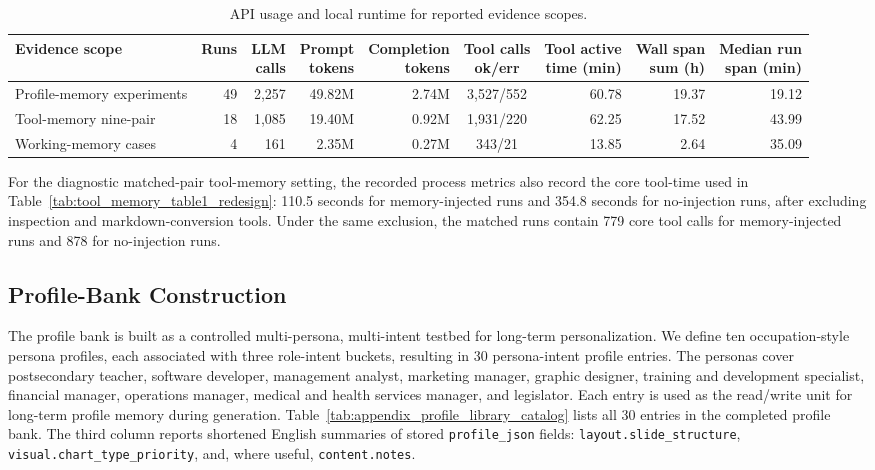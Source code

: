 \documentclass{llmxive}
\providecommand{\arraystretch}{1.0}
\begin{document}
\begin{table}[!htbp]
\centering
\scriptsize
\setlength{\tabcolsep}{3pt}
\renewcommand{\arraystretch}{1.05}
\begin{tabular*}{\textwidth}{@{\extracolsep{\fill}}lrrrrcrrr@{}}
\toprule
Evidence scope & Runs & \shortstack{LLM\\calls} &
\shortstack{Prompt\\tokens} & \shortstack{Completion\\tokens} &
\shortstack{Tool calls\\ok/err} & \shortstack{Tool active\\time (min)} &
\shortstack{Wall span\\sum (h)} & \shortstack{Median run\\span (min)} \\
\midrule
Profile-memory experiments & 49 & 2{,}257 & 49.82M & 2.74M & 3{,}527/552 & 60.78 & 19.37 & 19.12 \\
Tool-memory nine-pair & 18 & 1{,}085 & 19.40M & 0.92M & 1{,}931/220 & 62.25 & 17.52 & 43.99 \\
Working-memory cases & 4 & 161 & 2.35M & 0.27M & 343/21 & 13.85 & 2.64 & 35.09 \\
\bottomrule
\end{tabular*}
\caption{API usage and local runtime for reported evidence scopes.}
\label{tab:appendix_compute_accounting}
\end{table}


For the diagnostic matched-pair tool-memory setting, the recorded process metrics
also record the core tool-time used in Table~\ref{tab:tool_memory_table1_redesign}:
110.5 seconds for memory-injected runs and 354.8 seconds for no-injection runs,
after excluding inspection and markdown-conversion tools. Under the same
exclusion, the matched runs contain 779 core tool calls for memory-injected
runs and 878 for no-injection runs.

\subsection{Profile-Bank Construction}
\label{app:profile_bank_construction}

The profile bank is built as a controlled multi-persona, multi-intent
testbed for long-term personalization. We define ten occupation-style persona
profiles, each associated with three role-intent buckets, resulting in 30
persona-intent profile entries. The personas cover postsecondary teacher,
software developer, management analyst, marketing manager, graphic designer,
training and development specialist, financial manager, operations manager,
medical and health services manager, and legislator. Each entry is used as the
read/write unit for long-term profile memory during generation.
Table~\ref{tab:appendix_profile_library_catalog} lists all 30 entries in the
completed profile bank. The third column reports shortened English summaries
of stored \texttt{profile\_json} fields: \texttt{layout.slide\_structure},
\texttt{visual.chart\_type\_priority}, and, where useful,
\texttt{content.notes}.
\end{document}
